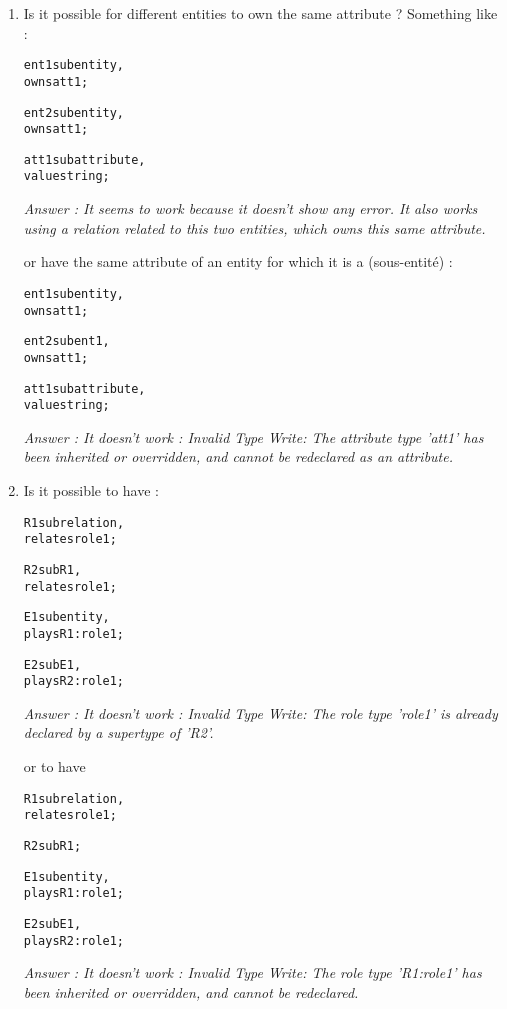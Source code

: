 \documentclass[runningheads]{llncs}
\begin{document}
\begin{enumerate}
  
\item Is it possible for different entities to own the same attribute ? 
Something like :

  \begin{alltt}
     ent1 sub entity,
       owns att1;
     	
     ent2 sub entity,
       owns att1;
    		
    	 att1 sub attribute,
       value string;
  \end{alltt}
  
\emph{Answer : It seems to work because it doesn't show any error. It also works using a relation related to this two entities, which owns this same attribute.  
}  
  
  
  
  
  
or have the same attribute of an entity for which it is a (sous-entité) :

\begin{alltt}
     ent1 sub entity,
       owns att1;
     	
     ent2 sub ent1,
       owns att1;
    		
    	 att1 sub attribute,
       value string;
  \end{alltt}
  
\emph{Answer : It doesn't work : Invalid Type Write: The attribute type 'att1' has been inherited or overridden, and cannot be redeclared as an attribute. }  





\item Is it possible to have :

  \begin{alltt}
     R1 sub relation,
     relates role1;
    
     R2 sub R1,
      relates role1;
      
    E1 sub entity,
    plays R1:role1;
    
    E2 sub E1,
    plays R2:role1;
  \end{alltt}
  
\emph{Answer : It doesn't work : Invalid Type Write: The role type 'role1' is already declared by a supertype of 'R2'.
}  

or to have

\begin{alltt}
     R1 sub relation,
     relates role1;
    
     R2 sub R1;
      
    E1 sub entity,
    plays R1:role1;
    
    E2 sub E1,
    plays R2:role1;
  \end{alltt}
  
\emph{Answer : It doesn't work : Invalid Type Write: The role type 'R1:role1' has been inherited or overridden, and cannot be redeclared.
}  


\end{enumerate}
\end{document}
